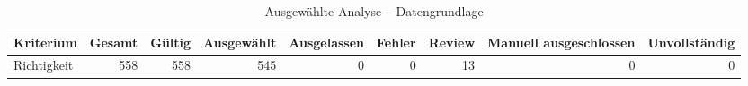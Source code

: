\begin{table}[htbp]
\centering
\caption{Ausgewählte Analyse -- Datengrundlage}
\begin{tabular}{lrrrrrrrr}
\toprule
Kriterium & Gesamt & Gültig & Ausgewählt & Ausgelassen & Fehler & Review & Manuell ausgeschlossen & Unvollständig \\
\midrule
Richtigkeit & 558 & 558 & 545 & 0 & 0 & 13 & 0 & 0 \\
\bottomrule
\end{tabular}
\end{table}
